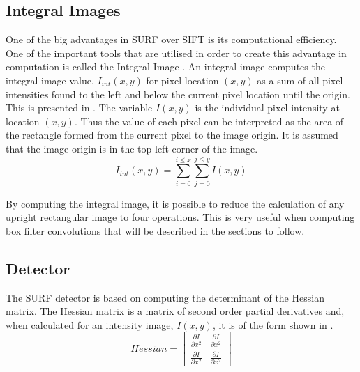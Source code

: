 \documentclass{report}
\begin{document}
\subsection{Integral Images}
\label{sec:integralImages}
One of the big advantages in SURF over SIFT \cite{Lowe2004} is its computational efficiency. One of the important tools that are utilised in order to create this advantage in computation is called the Integral Image \cite{Bay2008}. An integral image computes the integral image value, $I_{int}(x,y)$ for pixel location $(x,y)$  as a sum of all pixel intensities found to the left and below the current pixel location until the origin. This is presented in . The variable $I(x,y)$ is the individual pixel intensity at location $(x,y)$. Thus the value of each pixel can be interpreted as the area of the rectangle formed from the current pixel to the image origin. It is assumed that the image origin is in the top left corner of the image. \\

\begin{equation}
I_{int}(x,y) = \sum_{i=0}^{i \leq x}\sum_{j=0}^{j \leq y}I(x,y)
\label{eqn:integralImage}
\end{equation}

By computing the integral image, it is possible to reduce the calculation of any upright rectangular image to four operations. This is very useful when computing box filter convolutions that will be described in the sections to follow.\\

\subsection{Detector}
\label{2dsurfdetect}
The SURF detector is based on computing the determinant of the Hessian matrix. The Hessian matrix is a matrix of second order partial derivatives and, when calculated for an intensity image,  $I(x,y)$, it is of the form shown in .\\

\begin{equation}
Hessian = \left[ \begin{array}{cc} \frac{\partial I}{\partial x^2} & \frac{\partial I}{\partial x^2}\\
					    \frac{\partial I}{\partial x^2} & \frac{\partial I}{\partial x^2}\end{array} \right]
\label{eqn:hessian}
\end{equation}
\end{document}
